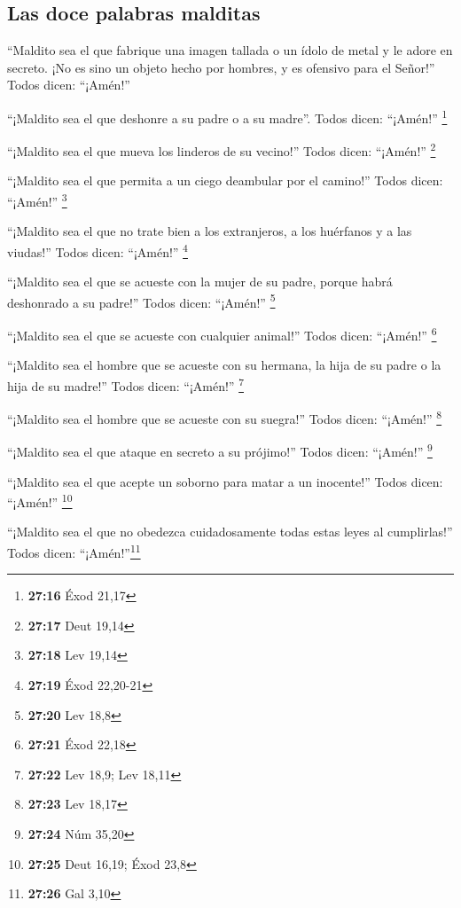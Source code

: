 \hypertarget{las-doce-palabras-malditas}{%
\subsection{Las doce palabras
malditas}\label{las-doce-palabras-malditas}}

 ``Maldito sea el que fabrique una imagen tallada o un
ídolo de metal y le adore en secreto. ¡No es sino un objeto hecho por
hombres, y es ofensivo para el Señor!'' Todos dicen: ``¡Amén!''

 ``¡Maldito sea el que deshonre a su padre o a su
madre''. Todos dicen: ``¡Amén!'' \footnote{\textbf{27:16} Éxod 21,17}

 ``¡Maldito sea el que mueva los linderos de su vecino!''
Todos dicen: ``¡Amén!'' \footnote{\textbf{27:17} Deut 19,14}

 ``¡Maldito sea el que permita a un ciego deambular por
el camino!'' Todos dicen: ``¡Amén!'' \footnote{\textbf{27:18} Lev 19,14}

 ``¡Maldito sea el que no trate bien a los extranjeros, a
los huérfanos y a las viudas!'' Todos dicen: ``¡Amén!'' \footnote{\textbf{27:19}
  Éxod 22,20-21}

 ``¡Maldito sea el que se acueste con la mujer de su
padre, porque habrá deshonrado a su padre!'' Todos dicen: ``¡Amén!''
\footnote{\textbf{27:20} Lev 18,8}

 ``¡Maldito sea el que se acueste con cualquier animal!''
Todos dicen: ``¡Amén!'' \footnote{\textbf{27:21} Éxod 22,18}

 ``¡Maldito sea el hombre que se acueste con su hermana,
la hija de su padre o la hija de su madre!'' Todos dicen: ``¡Amén!''
\footnote{\textbf{27:22} Lev 18,9; Lev 18,11}

 ``¡Maldito sea el hombre que se acueste con su suegra!''
Todos dicen: ``¡Amén!'' \footnote{\textbf{27:23} Lev 18,17}

 ``¡Maldito sea el que ataque en secreto a su prójimo!''
Todos dicen: ``¡Amén!'' \footnote{\textbf{27:24} Núm 35,20}

 ``¡Maldito sea el que acepte un soborno para matar a un
inocente!'' Todos dicen: ``¡Amén!'' \footnote{\textbf{27:25} Deut 16,19;
  Éxod 23,8}

 ``¡Maldito sea el que no obedezca cuidadosamente todas
estas leyes al cumplirlas!'' Todos dicen: ``¡Amén!''\footnote{\textbf{27:26}
  Gal 3,10}

